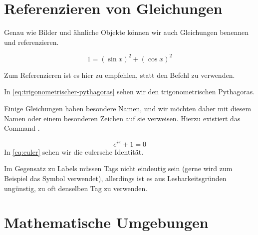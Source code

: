 \section{Referenzieren von Gleichungen}

Genau wie Bilder und ähnliche Objekte können wir auch Gleichungen benennen und referenzieren.
\begin{latexlisting}
	\begin{equation*}\label{eq:trigonometrischer-pythagoras}
		1 = (\sin x)^2 + (\cos x)^2
	\end{equation*}
\end{latexlisting}
Zum Referenzieren ist es hier zu empfehlen, statt  den Befehl  zu verwenden.
\begin{latexlisting}
	In \eqref{eq:trigonometrischer-pythagoras} sehen wir den trigonometrischen Pythagoras.
\end{latexlisting}
Einige Gleichungen haben besondere Namen, und wir möchten daher mit diesem Namen oder einem besonderen Zeichen auf sie verweisen.
Hierzu existiert das Command .
\begin{latexlisting}
	\begin{equation*}\label{eq:euler}\tag{Euler}
		e^{i \pi} + 1 = 0
	\end{equation*}
	In \eqref{eq:euler} sehen wir die eulersche Identität.
\end{latexlisting}
Im Gegensatz zu Labels müssen Tags nicht eindeutig sein (gerne wird zum Beispiel das Symbol \star{} verwendet), allerdings ist es aus Lesbarkeitsgründen ungünstig, zu oft denselben Tag zu verwenden.

\section{Mathematische Umgebungen}

